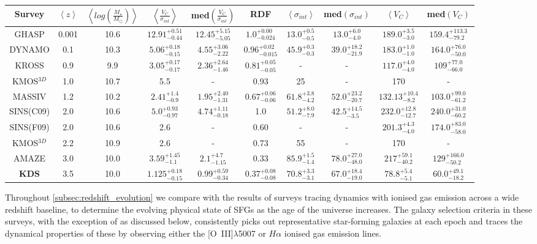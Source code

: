 \documentclass[fleqn,usenatbib]{mn2e}
\begin{document}
\begin{table*}
\begin{threeparttable}
\begin{tabular}{c c c c c c c c c c }
 \hline
Survey & $\left< z \right> $ & $\left< log\left(\frac{M_{\star}}{M_{\odot}}\right)\right>$ & $\left< \frac{V_{C}}{\sigma_{int}} \right>$ & med$\left(\frac{V_{C}}{\sigma_{int}}\right)$ & RDF & $ \left< \sigma_{int} \right>$ & med$\left(\sigma_{int}\right)$ & $\left<V_{C}\right>$ & med$\left(V_{C}\right)$  \\
 \hline
 GHASP & 0.001 & 10.6 & $12.91^{+0.51}_{-0.44}$ & $12.45^{+5.15}_{-5.05}$ & $1.0^{+0.00}_{-0.024}$ & $13.0^{+0.5}_{-0.5}$ & $13.0^{+6.0}_{-4.0}$ & $189.0^{+3.5}_{-3.0}$ & $159.4^{+113.3}_{-79.2}$ \\
 DYNAMO & 0.1 & 10.3 & $5.06^{+0.18}_{-0.15}$ & $4.55^{+3.06}_{-2.22}$ & $0.96^{+0.02}_{-0.015}$ & $45.9^{+0.3}_{-0.3}$ & $39.0^{+18.2}_{-21.9}$ & $183.0^{+1.0}_{-1.0}$ & $164.0^{+76.0}_{-50.0}$ \\
 KROSS & 0.9 & 9.9 & $3.05^{+0.17}_{-0.17}$ & $2.36^{+2.64}_{-1.46}$ & $0.81^{+0.05}_{-0.05}$ & - & - & $117.0^{+4.0}_{-4.0}$ & $109^{+77.0}_{-66.0}$ \\
 KMOS$^{3D}$ & 1.0 & 10.7 & 5.5 & - & 0.93 & 25 & - & 170 & - \\
 MASSIV & 1.2 & 10.2 & $2.41^{+1.4}_{-0.9}$ & $1.95^{+2.40}_{-1.31}$ & $0.67^{+0.06}_{-0.06}$ & $61.8^{+3.8}_{-4.2}$ & $52.0^{+23.2}_{-20.7}$ & $132.13^{+10.4}_{-8.2}$ & $103.0^{+99.0}_{-61.2}$ \\
 SINS(C09) & 2.0 & 10.6 & $5.0^{+0.93}_{-0.97}$ & $4.74^{+1.11}_{-0.18}$ & 1.0 & $51.2^{+8.0}_{-7.9}$ & $42.5^{+14.5}_{-3.5}$ & $232.0^{+12.8}_{-12.7}$ & $240.0^{+31.0}_{-60.2}$ \\
 SINS(F09) & 2.0 & 10.6 & 2.6 & - & 0.60 & - & - & $201.3^{+4.3}_{-4.0}$ & $174.0^{+83.0}_{-58.0}$ \\
 KMOS$^{3D}$ & 2.2 & 10.9 & 2.6 & - & 0.73 & 55 & - & 170 & - \\
 AMAZE & 3.0 & 10.0 & $3.59^{+1.45}_{-1.1}$ & $2.1^{+4.7}_{-1.15}$ & 0.33 & $85.9^{+1.5}_{-1.4}$ & $78.0^{+27.0}_{-48.0}$ & $217^{+59.1}_{-40.2}$ & $129^{+166.0}_{-50.2}$ \\
 \textbf{KDS} & 3.5 & 10.0 & $1.125^{+0.18}_{-0.15}$ & $0.99^{+0.59}_{-0.34}$ & $0.37^{+0.08}_{-0.08}$ & $70.8^{+3.3}_{-3.1}$ & $67.0^{+18.4}_{-19.0}$ & $78.8^{+5.4}_{-5.1}$ & $60.0^{+49.1}_{-18.2}$ \\
 \hline
\end{tabular}
  \end{threeparttable}
  \end{table*}

Throughout \cref{subsec:redshift_evolution} we compare with the results of surveys tracing dynamics with ionised gas emission across a wide redshift baseline, to determine the evolving physical state of SFGs as the age of the universe increases.
The galaxy selection criteria in these surveys, with the exception of \cite{Green2014} as discussed below, consistently picks out representative star-forming galaxies at each epoch and traces the dynamical properties of these by observing either the [O~{\sc III}]$\lambda$5007 or $H\alpha$ ionised gas emission lines.
\end{document}
